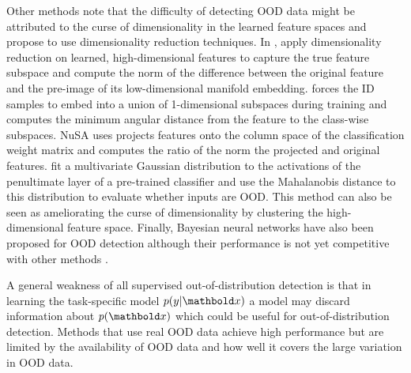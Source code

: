 Other methods note that the difficulty of detecting OOD data might be attributed to the curse of dimensionality in the learned feature spaces and propose to use dimensionality reduction techniques. In \textcite{ndiour_outofdistribution_2020}, apply dimensionality reduction on learned, high-dimensional features to capture the true feature subspace and compute the norm of the difference between the original feature and the pre-image of its low-dimensional manifold embedding. 
\textcite{zaeemzadeh_outofdistribution_2021} forces the ID samples to embed into a union of 1-dimensional subspaces during training and computes the minimum angular distance from the feature to the class-wise subspaces. 
NuSA \cite{cook_outlier_2020} uses projects features onto the column space of the classification weight matrix and computes the ratio of the norm the projected and original features.
\textcite{lee_simple_2018} fit a multivariate Gaussian distribution to the activations of the penultimate layer of a pre-trained classifier and use the Mahalanobis distance to this distribution to evaluate whether inputs are OOD. This method can also be seen as ameliorating the curse of dimensionality by clustering the high-dimensional feature space. 
Finally, Bayesian neural networks have also been proposed for OOD detection although their performance is not yet competitive with other methods \cite{henning_are_2021,dangelo_outofdistribution_2022,nguyen_out_2022}. 

A general weakness of all supervised out-of-distribution detection is that in learning the task-specific model $p(y|\xb)$ a model may discard information about $p(\xb)$ which could be useful for out-of-distribution detection.
Methods that use real OOD data achieve high performance but are limited by the availability of OOD data and how well it covers the large variation in OOD data.





